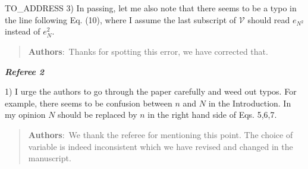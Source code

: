 \documentclass[a4paper,10pt]{letter}
\begin{document}
\begin{letter}{TO_ADDRESS}
3) In passing, let me also note that there seems to be a typo in the 
line following Eq. (10), where I assume the last subscript of 
$\mathcal{V}$ should read $e_{N^2}$ instead of $e_N^2$.

\begin{quote}
	\textbf{Authors}:\ Thanks for spotting this error, we have corrected that.
\end{quote}


\begin{center}
	\textit{\textbf{Referee 2}}
\end{center}

1) I urge the authors to go through the paper carefully and weed out 
typos. For example, there seems to be confusion between $n$ and $N$ in the 
Introduction. In my opinion $N$ should be replaced by $n$ in the right 
hand side of Eqs. 5,6,7.

\begin{quote}
	\textbf{Authors}:\ We thank the referee for mentioning this point. The choice of variable is indeed inconsistent which we have revised and changed in the manuscript.
\end{quote}

\end{letter}
\end{document}
